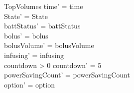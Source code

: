 \begin{schema}{TopVolumes}
	time' = time\\ State' = State\\
	\pagebreak 
	battStatus' = battStatus\\
	bolus' = bolus\\
	bolusVolume' = bolusVolume\\
	infusing' = infusing\\
	countdown > 0 \land countdown' = 5\\
	powerSavingCount' = powerSavingCount\\ option' = option\\
\end{schema}

